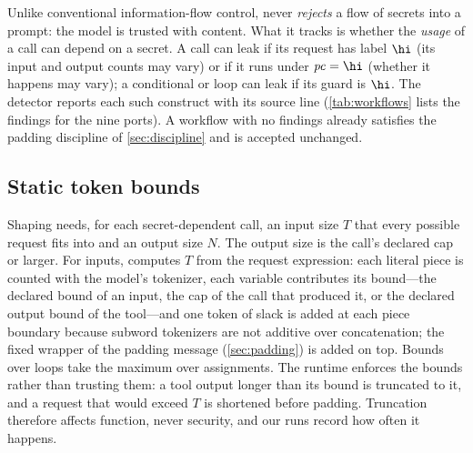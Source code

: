 Unlike conventional information-flow control, \sys never \emph{rejects} a flow of secrets into a prompt: the model is trusted with content. What it tracks is whether the \emph{usage} of a call can depend on a secret. A call can leak if its request has label $\hi$ (its input and output counts may vary) or if it runs under $\mathit{pc}=\hi$ (whether it happens may vary); a conditional or loop can leak if its guard is $\hi$. The detector reports each such construct with its source line (\cref{tab:workflows} lists the findings for the nine ports). A workflow with no findings already satisfies the padding discipline of \cref{sec:discipline} and is accepted unchanged.

\subsection{Static token bounds}\label{sec:bounds}

Shaping needs, for each secret-dependent call, an input size $T$ that every possible request fits into and an output size $N$. The output size is the call's declared cap or larger. For inputs, \sys computes $T$ from the request expression: each literal piece is counted with the model's tokenizer, each variable contributes its bound---the declared bound of an input, the cap of the call that produced it, or the declared output bound of the tool---and one token of slack is added at each piece boundary because subword tokenizers are not additive over concatenation; the fixed wrapper of the padding message (\cref{sec:padding}) is added on top. Bounds over loops take the maximum over assignments. The runtime enforces the bounds rather than trusting them: a tool output longer than its bound is truncated to it, and a request that would exceed $T$ is shortened before padding. Truncation therefore affects function, never security, and our runs record how often it happens.
